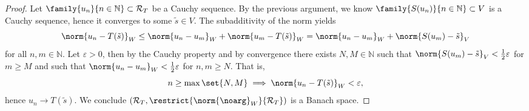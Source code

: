 \begin{proof}
    Let \(\family{u_n}{n\in \mathbb{N}} \subset \range{T}\) be a Cauchy sequence. By the previous argument, we know \(\family{S(u_n)}{n\in \mathbb{N}} \subset V\) is a Cauchy sequence, hence it converges to some \(\tilde{s} \in V\). The subadditivity of the norm yields
    \begin{equation*}
        \norm{u_n - T(\tilde{s})}_W \leq \norm{u_n - u_m}_W + \norm{u_m - T(\tilde{s})}_W = \norm{u_n - u_m}_W + \norm{S(u_m) - \tilde{s}}_V
    \end{equation*}
    for all \(n, m \in \mathbb{N}\). Let \(\varepsilon > 0\), then by the Cauchy property and by convergence there exists \(N, M \in \mathbb{N}\) such that \(\norm{S(u_m) - \tilde{s}}_V < \frac12 \varepsilon\) for \(m \geq M\) and such that \(\norm{u_n - u_m}_W < \frac12 \varepsilon\) for \(n,m \geq N\). That is,
    \begin{equation*}
        n \geq \max\set{N,M} \implies \norm{u_n - T(\tilde{s})}_W < \varepsilon,
    \end{equation*}
    hence \(u_n \to T(\tilde{s})\). We conclude \((\range{T}, \restrict{\norm{\noarg}_W}{\range{T}})\) is a Banach space.
\end{proof}

